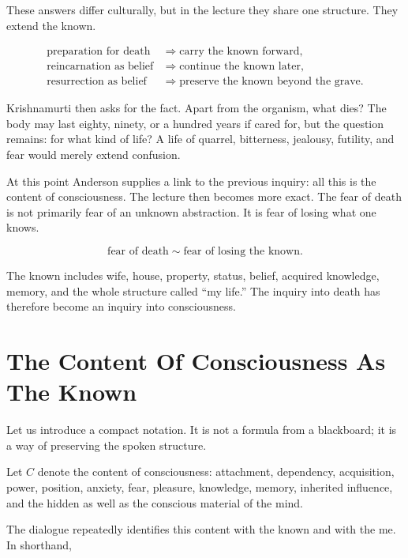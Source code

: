 These answers differ culturally, but in the lecture they share one structure. They extend the known.

\begin{align}
\text{preparation for death} &\Rightarrow \text{carry the known forward}, \\
\text{reincarnation as belief} &\Rightarrow \text{continue the known later}, \\
\text{resurrection as belief} &\Rightarrow \text{preserve the known beyond the grave}.
\end{align}

Krishnamurti then asks for the fact. Apart from the organism, what dies? The body may last eighty, ninety, or a hundred years if cared for, but the question remains: for what kind of life? A life of quarrel, bitterness, jealousy, futility, and fear would merely extend confusion.

At this point Anderson supplies a link to the previous inquiry: all this is the content of consciousness. The lecture then becomes more exact. The fear of death is not primarily fear of an unknown abstraction. It is fear of losing what one knows.

\begin{equation}
\text{fear of death}
\sim
\text{fear of losing the known}.
\end{equation}

The known includes wife, house, property, status, belief, acquired knowledge, memory, and the whole structure called ``my life.'' The inquiry into death has therefore become an inquiry into consciousness.

\section{The Content Of Consciousness As The Known}

Let us introduce a compact notation. It is not a formula from a blackboard; it is a way of preserving the spoken structure.

\begin{definition}
Let \(C\) denote the content of consciousness: attachment, dependency, acquisition, power, position, anxiety, fear, pleasure, knowledge, memory, inherited influence, and the hidden as well as the conscious material of the mind.
\end{definition}

The dialogue repeatedly identifies this content with the known and with the me. In shorthand,

